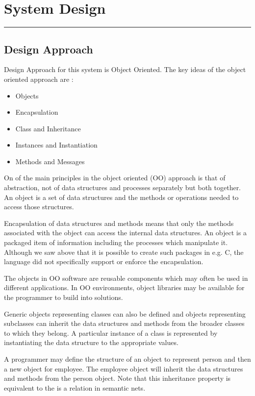 \chapter{System Design}\hrule
\label{Chapter:3}

\section{Design Approach}
Design Approach for this system is Object Oriented. The key ideas of the object oriented approach are :

\begin{itemize}
	\item Objects
	\item Encapsulation
	\item Class and Inheritance
	\item Instances and Instantiation
	\item Methods and Messages
\end{itemize}

On of the main principles in the object oriented (OO) approach is that of abstraction, not of data structures and processes separately but both together. An object is a set of data structures and the methods or operations needed to access those structures.

Encapsulation of data structures and methods means that only the methods associated with the object can access the internal data structures. An object is a packaged item of information including the processes which manipulate it. Although we saw above that it is possible to create such packages in e.g. C, the language did not specifically support or enforce the encapsulation.

The objects in OO software are reusable components which may often be used in different applications. In OO environments, object libraries may be available for the programmer to build into solutions.

Generic objects representing classes can also be defined and objects representing subclasses can inherit the data structures and methods from the broader classes to which they belong. A particular instance of a class is represented by instantiating the data structure to the appropriate values.

A programmer may define the structure of an object to represent person and then a new object for employee. The employee object will inherit the data structures and methods from the person object. Note that this inheritance property is equivalent to the is a relation in semantic nets.

